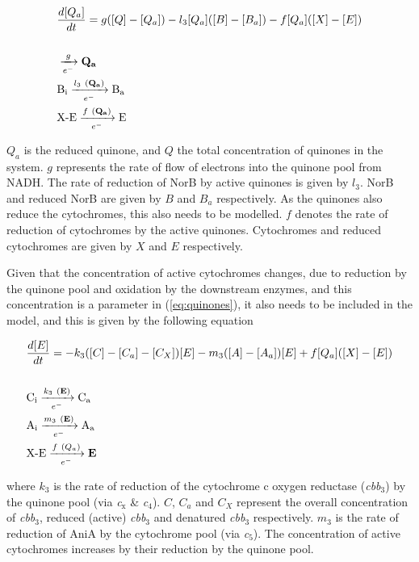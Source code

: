 \begin{eqnarray}
&\frac{d[Q_a]}{dt} = g([Q] - [Q_a]) - l_3[Q_a]([B] - [B_a]) - f[Q_a]([X]-[E]) \nonumber \\\nonumber \\
&\xrightarrow[e^-]{g} \bold{Q_a} \nonumber \\
&\textnormal{B$_\textnormal{i}$} \xrightarrow[e^-]{l_3~(\bold{Q_a})} \textnormal{B$_\textnormal{a}$} \nonumber \\
&\textnormal{X-E} \xrightarrow[e^-]{f~(\bold{Q_a})} \textnormal{E}
\label{eq:quinones}
\end{eqnarray}

$Q_a$ is the reduced quinone, and $Q$ the total concentration of quinones in the system. $g$ represents the rate of flow of electrons into the quinone pool from NADH. The rate of reduction of NorB by active quinones is given by $l_3$. NorB and reduced NorB are given by $B$ and $B_a$ respectively. As the quinones also reduce the cytochromes, this also needs to be modelled. $f$ denotes the rate of reduction of cytochromes by the active quinones. Cytochromes and reduced cytochromes are given by $X$ and $E$ respectively.

Given that the concentration of active cytochromes changes, due to reduction by the quinone pool and oxidation by the downstream enzymes, and this concentration is a parameter in (\ref{eq:quinones}), it also needs to be included in the model, and this is given by the following equation

\begin{eqnarray}
&\frac{d[E]}{dt} = -k_3([C] - [C_a] - [C_X])[E]  - m_3([A] - [A_a])[E] + f[Q_a]([X]-[E]) \nonumber \\\nonumber \\
&\textnormal{C$_\textnormal{i}$} \xrightarrow[e^-]{k_3~(\bold{E})} \textnormal{C$_\textnormal{a}$} \nonumber \\
&\textnormal{A$_\textnormal{i}$} \xrightarrow[e^-]{m_3~(\bold{E})} \textnormal{A$_\textnormal{a}$} \nonumber \\
&\textnormal{X-E} \xrightarrow[e^-]{f~(Q_a)} \bold{E}
\label{eq:cytochromes}
\end{eqnarray}

where $k_3$ is the rate of reduction of the cytochrome c oxygen reductase (\textit{cbb$_{\textrm{3}}$}) by the quinone pool (via \textit{c$_{\textrm{x}}$} \& \textit{c$_{\textrm{4}}$}). $C$, $C_a$ and $C_X$ represent the overall concentration of \textit{cbb$_{\textrm{3}}$}, reduced (active) \textit{cbb$_{\textrm{3}}$} and denatured \textit{cbb$_{\textrm{3}}$} respectively. $m_3$ is the rate of reduction of AniA by the cytochrome pool (via \textit{c$_{\textrm{5}}$}). The concentration of active cytochromes increases by their reduction by the quinone pool.

